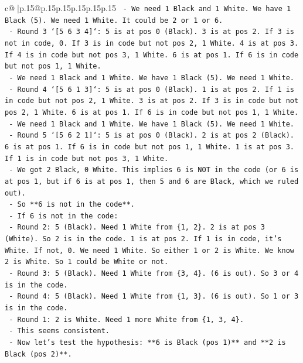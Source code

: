 \documentclass{article}
\begin{document}
{\begin{supertabular}{c@{$\;$}|p{.15\linewidth}@{}p{.15\linewidth}p{.15\linewidth}p{.15\linewidth}p{.15\linewidth}p{.15\linewidth}}
{{{\texttt{            {-} We need 1 Black and 1 White. We have 1 Black (5). We need 1 White. It could be 2 or 1 or 6.} \\
\texttt{            {-} Round 3 `{[}5 6 3 4{]}`: 5 is at pos 0 (Black). 3 is at pos 2. If 3 is not in code, 0. If 3 is in code but not pos 2, 1 White. 4 is at pos 3. If 4 is in code but not pos 3, 1 White. 6 is at pos 1. If 6 is in code but not pos 1, 1 White.} \\
\texttt{            {-} We need 1 Black and 1 White. We have 1 Black (5). We need 1 White.} \\
\texttt{            {-} Round 4 `{[}5 6 1 3{]}`: 5 is at pos 0 (Black). 1 is at pos 2. If 1 is in code but not pos 2, 1 White. 3 is at pos 2. If 3 is in code but not pos 2, 1 White. 6 is at pos 1. If 6 is in code but not pos 1, 1 White.} \\
\texttt{            {-} We need 1 Black and 1 White. We have 1 Black (5). We need 1 White.} \\
\texttt{            {-} Round 5 `{[}5 6 2 1{]}`: 5 is at pos 0 (Black). 2 is at pos 2 (Black). 6 is at pos 1. If 6 is in code but not pos 1, 1 White. 1 is at pos 3. If 1 is in code but not pos 3, 1 White.} \\
\texttt{            {-} We got 2 Black, 0 White. This implies 6 is NOT in the code (or 6 is at pos 1, but if 6 is at pos 1, then 5 and 6 are Black, which we ruled out).} \\
\texttt{            {-} So **6 is not in the code**.} \\
\texttt{            {-} If 6 is not in the code:} \\
\texttt{                {-} Round 2: 5 (Black). Need 1 White from \{1, 2\}. 2 is at pos 3 (White). So 2 is in the code. 1 is at pos 2. If 1 is in code, it's White. If not, 0. We need 1 White. So either 1 or 2 is White. We know 2 is White. So 1 could be White or not.} \\
\texttt{                {-} Round 3: 5 (Black). Need 1 White from \{3, 4\}. (6 is out). So 3 or 4 is in the code.} \\
\texttt{                {-} Round 4: 5 (Black). Need 1 White from \{1, 3\}. (6 is out). So 1 or 3 is in the code.} \\
\texttt{                {-} Round 1: 2 is White. Need 1 more White from \{1, 3, 4\}.} \\
\texttt{            {-} This seems consistent.} \\
\texttt{            {-} Now let's test the hypothesis: **6 is Black (pos 1)** and **2 is Black (pos 2)**.} \\
}}}
\end{supertabular}}
\end{document}
